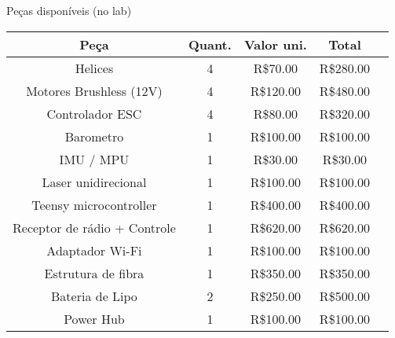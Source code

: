 \begin{frame}[t]{Peças disponíveis (no lab)}
  \transboxout[duration=0.5]
  \centering

  \begin{tabular}{c | c | c | c | c}
    Peça             & Quant. & Valor uni. & Total     &  \\ \hline
    Helices            & 4      & R\$70.00   & R\$280.00 &  \\
    Motores Brushless (12V)    & 4      & R\$120.00  & R\$480.00 &  \\
    Controlador ESC        & 4      & R\$80.00   & R\$320.00 &  \\
    Barometro           & 1      & R\$100.00  & R\$100.00 &  \\
    IMU / MPU           & 1      & R\$30.00   & R\$30.00  &  \\
    Laser unidirecional      & 1      & R\$100.00  & R\$100.00 &  \\
    Teensy microcontroller    & 1      & R\$400.00  & R\$400.00 &  \\
    Receptor de rádio + Controle & 1      & R\$620.00  & R\$620.00 &  \\
    Adaptador Wi-Fi        & 1      & R\$100.00  & R\$100.00 &  \\
    Estrutura de fibra      & 1      & R\$350.00  & R\$350.00 &  \\
    Bateria de Lipo        & 2      & R\$250.00  & R\$500.00 &  \\
    Power Hub           & 1      & R\$100.00  & R\$100.00 &
  \end{tabular}

\end{frame}


